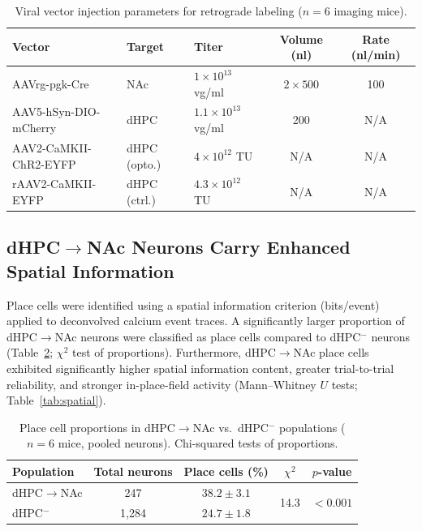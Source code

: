 \documentclass[11pt]{article}
\begin{document}
\begin{table}[htbp]
\centering
\caption{Viral vector injection parameters for retrograde labeling ($n = 6$ imaging mice).}
\label{tab:viral}
\begin{tabular}{lllcc}
\toprule
\textbf{Vector} & \textbf{Target} & \textbf{Titer} & \textbf{Volume (nl)} & \textbf{Rate (nl/min)} \\
\midrule
AAVrg-pgk-Cre & NAc & $1 \times 10^{13}$ vg/ml & $2 \times 500$ & 100 \\
AAV5-hSyn-DIO-mCherry & dHPC & $1.1 \times 10^{13}$ vg/ml & 200 & N/A \\
AAV2-CaMKII-ChR2-EYFP & dHPC (opto.) & $4 \times 10^{12}$ TU & N/A & N/A \\
rAAV2-CaMKII-EYFP & dHPC (ctrl.) & $4.3 \times 10^{12}$ TU & N/A & N/A \\
\bottomrule
\end{tabular}
\end{table}

\subsection{dHPC$\to$NAc Neurons Carry Enhanced Spatial Information}

Place cells were identified using a spatial information criterion (bits/event) applied to deconvolved calcium event traces. A significantly larger proportion of dHPC$\to$NAc neurons were classified as place cells compared to dHPC$^{-}$ neurons (Table~\ref{tab:placecell}; $\chi^2$ test of proportions). Furthermore, dHPC$\to$NAc place cells exhibited significantly higher spatial information content, greater trial-to-trial reliability, and stronger in-place-field activity (Mann--Whitney $U$ tests; Table~\ref{tab:spatial}).

\begin{table}[htbp]
\centering
\caption{Place cell proportions in dHPC$\to$NAc vs.\ dHPC$^{-}$ populations ($n = 6$ mice, pooled neurons). Chi-squared tests of proportions.}
\label{tab:placecell}
\begin{tabular}{lcccc}
\toprule
\textbf{Population} & \textbf{Total neurons} & \textbf{Place cells (\%)} & \textbf{$\chi^2$} & \textbf{$p$-value} \\
\midrule
dHPC$\to$NAc & 247 & $38.2 \pm 3.1$ & \multirow{2}{*}{14.3} & \multirow{2}{*}{$<0.001$} \\
dHPC$^{-}$ & 1,284 & $24.7 \pm 1.8$ & & \\
\bottomrule
\end{tabular}
\end{table}
\end{document}
